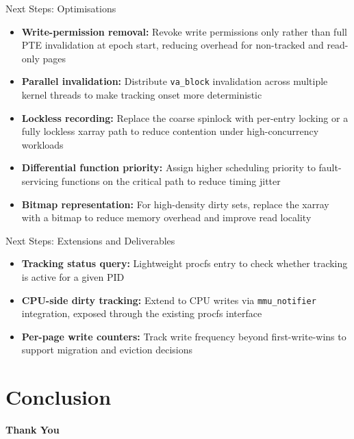 \documentclass [xcolor=svgnames, t] {beamer}
\begin{document}
\begin{frame}{Next Steps: Optimisations}
\begin{itemize}
    \item \textbf{Write-permission removal:} Revoke write permissions only rather than full PTE invalidation at epoch start, reducing overhead for non-tracked and read-only pages
    \item \textbf{Parallel invalidation:} Distribute \texttt{va\_block} invalidation across multiple kernel threads to make tracking onset more deterministic
    \item \textbf{Lockless recording:} Replace the coarse spinlock with per-entry locking or a fully lockless xarray path to reduce contention under high-concurrency workloads
    \item \textbf{Differential function priority:} Assign higher scheduling priority to fault-servicing functions on the critical path to reduce timing jitter
    \item \textbf{Bitmap representation:} For high-density dirty sets, replace the xarray with a bitmap to reduce memory overhead and improve read locality
\end{itemize}
\end{frame}

\begin{frame}{Next Steps: Extensions and Deliverables}
\begin{itemize}
    \item \textbf{Tracking status query:} Lightweight procfs entry to check whether tracking is active for a given PID
    \item \textbf{CPU-side dirty tracking:} Extend to CPU writes via \texttt{mmu\_notifier} integration, exposed through the existing procfs interface
    \item \textbf{Per-page write counters:} Track write frequency beyond first-write-wins to support migration and eviction decisions
\end{itemize}
\end{frame}

\section{Conclusion}

\begin{frame}{}
\vfill
\begin{center}
    {\Large \textbf{Thank You}}
\end{center}
\vfill
\end{frame}
\end{document}
